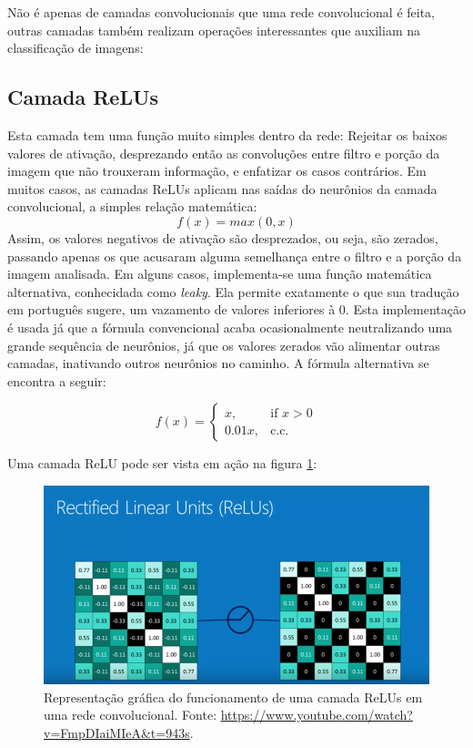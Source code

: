 \documentclass[
	12pt,				%
	oneside,			%
	a4paper,			%
	english,			%
	french,				%
	spanish,			%
	brazil,				%
	]{abntex2}
\begin{document}
Não é apenas de camadas convolucionais que uma rede convolucional é feita, outras camadas também realizam operações interessantes que auxiliam na classificação de imagens:

\subsection{Camada ReLUs}
Esta camada tem uma função muito simples dentro da rede: Rejeitar os baixos valores de ativação, desprezando então as convoluções entre filtro e porção da imagem que não trouxeram informação, e enfatizar os casos contrários. Em muitos casos, as camadas ReLUs aplicam nas saídas do neurônios da camada convolucional, a simples relação matemática:
\begin{equation}
	f(x) = max(0,x)
	\label{eq_relus}
\end{equation}
Assim, os valores negativos de ativação são desprezados, ou seja, são zerados, passando apenas os que acusaram alguma semelhança entre o filtro e a porção da imagem analisada. Em alguns casos, implementa-se uma função matemática alternativa, conhecidada como \textit{leaky}. Ela permite exatamente o que sua tradução em português sugere, um vazamento de valores inferiores à \(0\). Esta implementação é usada já que a fórmula convencional acaba ocasionalmente neutralizando uma grande sequência de neurônios, já que os valores zerados vão alimentar outras camadas, inativando outros neurônios no caminho. A fórmula alternativa se encontra a seguir:

\[
f(x)= 
\begin{cases}
x,& \text{if } x > 0  \\      
0.01x,& \text{c.c.}
\end{cases}
\]

Uma camada ReLU pode ser vista em ação na figura \ref{relus}:

\begin{figure}[H]
	\centering
	\includegraphics[width=.8\textwidth]{imagens/relus}
	\caption{Representação gráfica do funcionamento de uma camada ReLUs em uma rede convolucional. Fonte: \href{https://www.youtube.com/watch?v=FmpDIaiMIeA&t=943s}{https://www.youtube.com/watch?v=FmpDIaiMIeA&t=943s}.}
	\label{relus}
\end{figure} 
\end{document}

